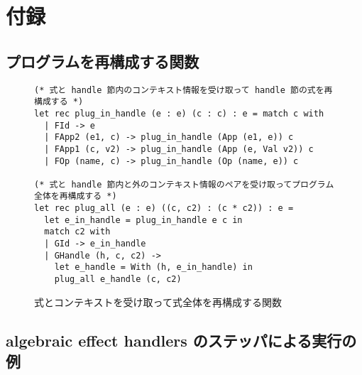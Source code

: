 \newpage
\appendix
\section{付録}

\subsection{プログラムを再構成する関数}

\begin{figure}[h]
\begin{spacing}{0.9}
\begin{verbatim}
(* 式と handle 節内のコンテキスト情報を受け取って handle 節の式を再構成する *)
let rec plug_in_handle (e : e) (c : c) : e = match c with
  | FId -> e
  | FApp2 (e1, c) -> plug_in_handle (App (e1, e)) c
  | FApp1 (c, v2) -> plug_in_handle (App (e, Val v2)) c
  | FOp (name, c) -> plug_in_handle (Op (name, e)) c

(* 式と handle 節内と外のコンテキスト情報のペアを受け取ってプログラム全体を再構成する *)
let rec plug_all (e : e) ((c, c2) : (c * c2)) : e =
  let e_in_handle = plug_in_handle e c in
  match c2 with
  | GId -> e_in_handle
  | GHandle (h, c, c2) ->
    let e_handle = With (h, e_in_handle) in
    plug_all e_handle (c, c2)
\end{verbatim}
\end{spacing}
\caption{式とコンテキストを受け取って式全体を再構成する関数}
\label{figure:plug_all}
\end{figure}

\subsection{algebraic effect handlers のステッパによる実行の例}
\label{subsection:step_example}

